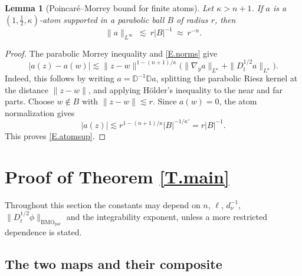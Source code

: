 \documentclass[10pt,a4paper]{amsart}
\numberwithin{equation}{section}
\newcommand{\dhalf}{D_t^{1/2}}
\newcommand{\BMOpar}{\mathrm{BMO}_{\mathrm{par}}}
\newcommand{\Dpar}{\mathbb D}
\newtheorem{lemma}[equation]{Lemma}
\begin{document}
\begin{lemma}[Poincar\'e--Morrey bound for finite atoms]\label{L.atomsup}
Let $\kappa>n+1$. If $a$ is a $(1,\tfrac12,\kappa)$-atom supported in a
parabolic ball $B$ of radius $r$, then
\begin{equation}\label{E.atomsup}
 \|a\|_{L^\infty}\ \lesssim\ r|B|^{-1}\ \approx\ r^{-n}.
\end{equation}
\end{lemma}

\begin{proof}
The parabolic Morrey inequality and \eqref{E.norms} give
\[
 |a(z)-a(w)|\lesssim
 \|z-w\|^{1-(n+1)/\kappa}
 \big(\|\nabla_ya\|_{L^\kappa}+\|\dhalf a\|_{L^\kappa}\big).
\]
Indeed, this follows by writing $a=\Dpar^{-1}\Dpar a$, splitting the
parabolic Riesz kernel at the distance $\|z-w\|$, and applying H\"older's
inequality to the near and far parts. Choose $w\notin B$ with
$\|z-w\|\lesssim r$. Since $a(w)=0$, the atom normalization gives
\[
 |a(z)|\lesssim r^{1-(n+1)/\kappa}|B|^{-1/\kappa'}
 =r|B|^{-1}.
\]
This proves \eqref{E.atomsup}.
\end{proof}

\section{Proof of Theorem \ref{T.main}}\label{S.main}

Throughout this section the constants may depend on $n$, $\ell$,
$d_\nu^{-1}$, $\|\dhalf\phi\|_{\BMOpar}$ and the integrability exponent,
unless a more restricted dependence is stated.

\subsection{The two maps and their composite}\label{ss.maps}
\end{document}
